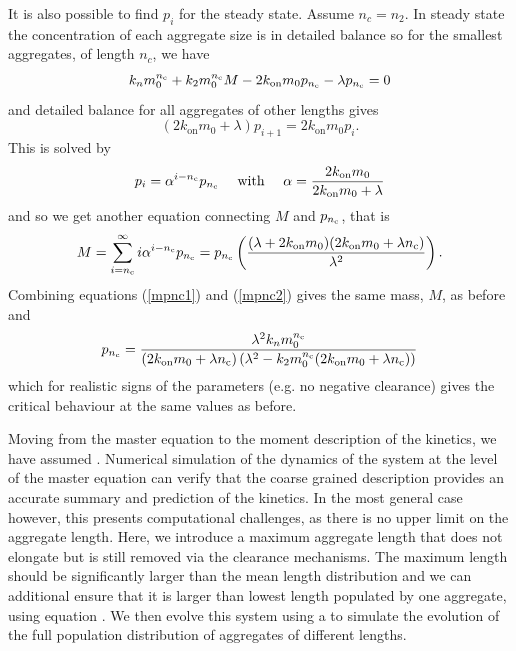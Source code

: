 It is also possible to find $p_i$ for the steady state. Assume $n_c=n_2$. In steady state the concentration of each aggregate size is in detailed balance so for the smallest aggregates, of length $n_c$, we have
\begin{equation}
    k_n m_0^{n_{\mathrm{c}}} + k_2 m_0^{n_{\mathrm{c}}} M - 2 k_\text{on} m_0 p_{n_{\mathrm{c}}} - \lambda p_{n_{\mathrm{c}}} = 0
    \label{mpnc1}
\end{equation}
and detailed balance for all aggregates of other lengths gives
\begin{equation}
    (2k_\text{on} m_0 + \lambda)p_{i+1} = 2k_\text{on} m_0 p_i.
\end{equation}
This is solved by
\begin{equation}
    p_i = \alpha^{i-n_{\mathrm{c}}} p_{n_{\mathrm{c}}}\quad\text{ with }\quad\alpha=\frac{2k_\text{on} m_0}{2k_\text{on} m_0 + \lambda}
\end{equation}
and so we get another equation connecting $M$ and $p_{n_{\mathrm{c}}}$, that is
\begin{equation}
    M = \sum_{i=n_{\mathrm{c}}}^{\infty}i\alpha^{i-n_{\mathrm{c}}} p_{n_{\mathrm{c}}} = p_{n_{\mathrm{c}}}\left( \frac{(\lambda +2k_\text{on} m_0) (2 k_\text{on} m_0 + \lambda  n_{\mathrm{c}})}{\lambda^2} \right).
    \label{mpnc2}
\end{equation}
Combining equations (\ref{mpnc1}) and (\ref{mpnc2}) gives the same mass, $M$, as before and 
\begin{equation}
    p_{n_{\mathrm{c}}} = \frac{\lambda^2 k_n m_0^{n_{\mathrm{c}}} }{(2 k_\text{on} m_0+\lambda n_{\mathrm{c}}) \left(\lambda ^2-k_2 m_0^{n_{\mathrm{c}}} (2 k_\text{on} m_0+\lambda  n_{\mathrm{c}})\right)}
\end{equation}
which for realistic signs of the parameters (e.g. no negative clearance) gives the critical behaviour at the same values as before. 

Moving from the master equation to the moment description of the kinetics, we have assumed . Numerical simulation of the dynamics of the system at the level of the master equation can verify that the coarse grained description provides an accurate summary and prediction of the kinetics. In the most general case however, this presents computational challenges, as there is no upper limit on the aggregate length. Here, we introduce a maximum aggregate length that does not elongate but is still removed via the clearance mechanisms. The maximum length should be significantly larger than the mean length distribution and we can additional ensure that it is larger than lowest length populated by one aggregate, using equation . We then evolve this system using a  to simulate the evolution of the full population distribution of aggregates of different lengths. 

